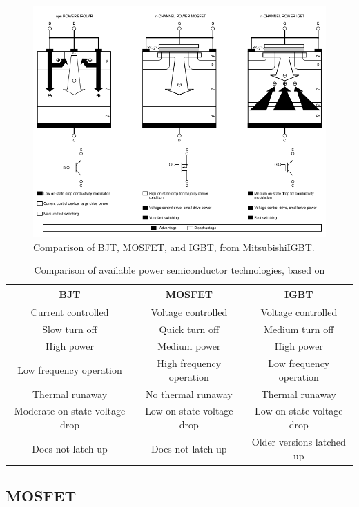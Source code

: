 \documentclass[12pt,a4paper]{article}
\begin{document}
\begin{figure}[ht!]
\centering
\includegraphics[width=150mm]{comparison1.png}
\caption{Comparison of BJT, MOSFET, and IGBT, from \citep{Blake}{MitsubishiIGBT}.}
\label{fig:comparison1}
\end{figure}

\begin{table}[ht!]
\centering
\begin{tabular}{|c|c|c|}
\hline 
BJT & MOSFET & IGBT \\ 
\hline 
Current controlled & Voltage controlled & Voltage controlled \\ 
\hline 
Slow turn off & Quick turn off & Medium turn off \\ 
\hline 
High power & Medium power & High power \\ 
\hline 
Low frequency operation & High frequency operation & Low frequency operation \\ 
\hline 
Thermal runaway & No thermal runaway & Thermal runaway \\ 
\hline 
Moderate on-state voltage drop & Low on-state voltage drop & Low on-state voltage drop \\ 
\hline 
Does not latch up & Does not latch up & Older versions latched up \\ 
\hline 
\end{tabular} 
\caption{Comparison of available power semiconductor technologies, based on \citet{Gorelik2002}}
\label{tab:semicompare}
\end{table}

\subsection{MOSFET}
\end{document}
